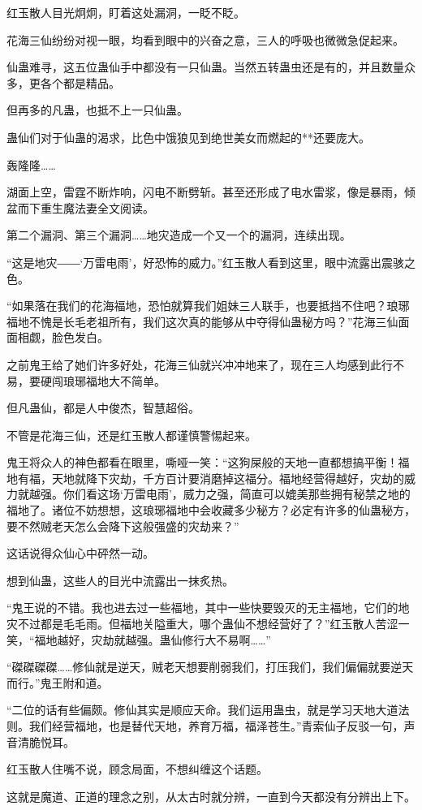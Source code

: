 \begin{this_body}
红玉散人目光炯炯，盯着这处漏洞，一眨不眨。

花海三仙纷纷对视一眼，均看到眼中的兴奋之意，三人的呼吸也微微急促起来。

仙蛊难寻，这五位蛊仙手中都没有一只仙蛊。当然五转蛊虫还是有的，并且数量众多，更各个都是精品。

但再多的凡蛊，也抵不上一只仙蛊。

蛊仙们对于仙蛊的渴求，比色中饿狼见到绝世美女而燃起的**还要庞大。

轰隆隆……

湖面上空，雷霆不断炸响，闪电不断劈斩。甚至还形成了电水雷浆，像是暴雨，倾盆而下重生魔法妻全文阅读。

第二个漏洞、第三个漏洞……地灾造成一个又一个的漏洞，连续出现。

“这是地灾――‘万雷电雨’，好恐怖的威力。”红玉散人看到这里，眼中流露出震骇之色。

“如果落在我们的花海福地，恐怕就算我们姐妹三人联手，也要抵挡不住吧？琅琊福地不愧是长毛老祖所有，我们这次真的能够从中夺得仙蛊秘方吗？”花海三仙面面相觑，脸色发白。

之前鬼王给了她们许多好处，花海三仙就兴冲冲地来了，现在三人均感到此行不易，要硬闯琅琊福地大不简单。

但凡蛊仙，都是人中俊杰，智慧超俗。

不管是花海三仙，还是红玉散人都谨慎警惕起来。

鬼王将众人的神色都看在眼里，嘶哑一笑：“这狗屎般的天地一直都想搞平衡！福地有福，天地就降下灾劫，千方百计要消磨掉这福分。福地经营得越好，灾劫的威力就越强。你们看这场‘万雷电雨’，威力之强，简直可以媲美那些拥有秘禁之地的福地了。诸位不妨想想，这琅琊福地中会收藏多少秘方？必定有许多的仙蛊秘方，要不然贼老天怎么会降下这般强盛的灾劫来？”

这话说得众仙心中砰然一动。

想到仙蛊，这些人的目光中流露出一抹炙热。

“鬼王说的不错。我也进去过一些福地，其中一些快要毁灭的无主福地，它们的地灾不过都是毛毛雨。但福地关隘重大，哪个蛊仙不想经营好了？”红玉散人苦涩一笑，“福地越好，灾劫就越强。蛊仙修行大不易啊……”

“磔磔磔磔……修仙就是逆天，贼老天想要削弱我们，打压我们，我们偏偏就要逆天而行。”鬼王附和道。

“二位的话有些偏颇。修仙其实是顺应天命。我们运用蛊虫，就是学习天地大道法则。我们经营福地，也是替代天地，养育万福，福泽苍生。”青索仙子反驳一句，声音清脆悦耳。

红玉散人住嘴不说，顾念局面，不想纠缠这个话题。

这就是魔道、正道的理念之别，从太古时就分辨，一直到今天都没有分辨出上下。


\end{this_body}
